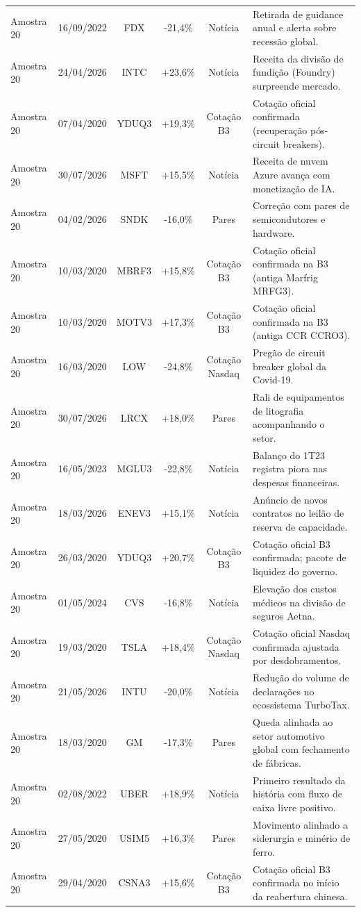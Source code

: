 \documentclass[11pt,a4paper]{article}
\begin{document}
\begin{longtable}{l c c c c p{}}
Amostra 20 & 16/09/2022 & FDX & -21,4\% & Notícia & Retirada de guidance anual e alerta sobre recessão global. \\
Amostra 20 & 24/04/2026 & INTC & +23,6\% & Notícia & Receita da divisão de fundição (Foundry) surpreende mercado. \\
Amostra 20 & 07/04/2020 & YDUQ3 & +19,3\% & Cotação B3 & Cotação oficial confirmada (recuperação pós-circuit breakers). \\
Amostra 20 & 30/07/2026 & MSFT & +15,5\% & Notícia & Receita de nuvem Azure avança com monetização de IA. \\
Amostra 20 & 04/02/2026 & SNDK & -16,0\% & Pares & Correção com pares de semicondutores e hardware. \\
Amostra 20 & 10/03/2020 & MBRF3 & +15,8\% & Cotação B3 & Cotação oficial confirmada na B3 (antiga Marfrig MRFG3). \\
Amostra 20 & 10/03/2020 & MOTV3 & +17,3\% & Cotação B3 & Cotação oficial confirmada na B3 (antiga CCR CCRO3). \\
Amostra 20 & 16/03/2020 & LOW & -24,8\% & Cotação Nasdaq & Pregão de circuit breaker global da Covid-19. \\
Amostra 20 & 30/07/2026 & LRCX & +18,0\% & Pares & Rali de equipamentos de litografia acompanhando o setor. \\
Amostra 20 & 16/05/2023 & MGLU3 & -22,8\% & Notícia & Balanço do 1T23 registra piora nas despesas financeiras. \\
Amostra 20 & 18/03/2026 & ENEV3 & +15,1\% & Notícia & Anúncio de novos contratos no leilão de reserva de capacidade. \\
Amostra 20 & 26/03/2020 & YDUQ3 & +20,7\% & Cotação B3 & Cotação oficial B3 confirmada; pacote de liquidez do governo. \\
Amostra 20 & 01/05/2024 & CVS & -16,8\% & Notícia & Elevação dos custos médicos na divisão de seguros Aetna. \\
Amostra 20 & 19/03/2020 & TSLA & +18,4\% & Cotação Nasdaq & Cotação oficial Nasdaq confirmada ajustada por desdobramentos. \\
Amostra 20 & 21/05/2026 & INTU & -20,0\% & Notícia & Redução do volume de declarações no ecossistema TurboTax. \\
Amostra 20 & 18/03/2020 & GM & -17,3\% & Pares & Queda alinhada ao setor automotivo global com fechamento de fábricas. \\
Amostra 20 & 02/08/2022 & UBER & +18,9\% & Notícia & Primeiro resultado da história com fluxo de caixa livre positivo. \\
Amostra 20 & 27/05/2020 & USIM5 & +16,3\% & Pares & Movimento alinhado a siderurgia e minério de ferro. \\
Amostra 20 & 29/04/2020 & CSNA3 & +15,6\% & Cotação B3 & Cotação oficial B3 confirmada no início da reabertura chinesa. \\
\bottomrule
\end{longtable}

\newpage
\nocite{*}


\end{document}
